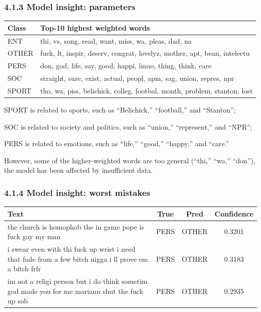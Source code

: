 \documentclass[11pt]{article}
\begin{document}
\newpage
\subsubsection*{4.1.3 Model insight: parameters}
\begin{table}[h]
\centering
\begin{tabular}{p{1.8cm} p{10.5cm}}
\hline
\textbf{Class} & \textbf{Top-10 highest weighted words} \\
\hline
ENT & thi, vs, song, read, want, miss, wa, pleas, dad, na \\
OTHER & fuck, lt, inspir, deserv, congrat, lovelyz, mother, apt, bean, intelectu \\
PERS & don, god, life, say, good, happi, lmao, thing, think, care \\
SOC & straight, sure, exist, actual, peopl, apm, sag, union, repres, npr \\
SPORT & tho, wa, piss, belichick, colleg, footbal, month, problem, stanton, lost \\
\hline
\end{tabular}
\end{table}

\noindent SPORT is related to sports, such as “Belichick,” “football,” and “Stanton”;

\noindent SOC is related to society and politics, such as “union,” “represent,” and “NPR”;

\noindent PERS is related to emotions, such as “life,” “good,” “happy,” and “care.”

\noindent However, some of the higher-weighted words are too general (“thi,” “wa,” “don”), the model has been affected by insufficient data.

\subsubsection*{4.1.4 Model insight: worst mistakes}

\begin{table}[h]
\centering
\begin{tabular}{p{8.5cm} c c c}
\hline
\textbf{Text} & \textbf{True} & \textbf{Pred} & \textbf{Confidence} \\
\hline
the church is homophob the in game pope is fuck gay my man & PERS & OTHER & 0.3201 \\
i swear even with thi fuck up wrist i need that fade from a few bitch nigga i ll prove em a bitch frfr & PERS & OTHER & 0.3183 \\
im not a religi person but i do think sometim god made you for me mariann shut the fuck up sob & PERS & OTHER & 0.2935 \\
\hline
\end{tabular}
\end{table}
\end{document}
